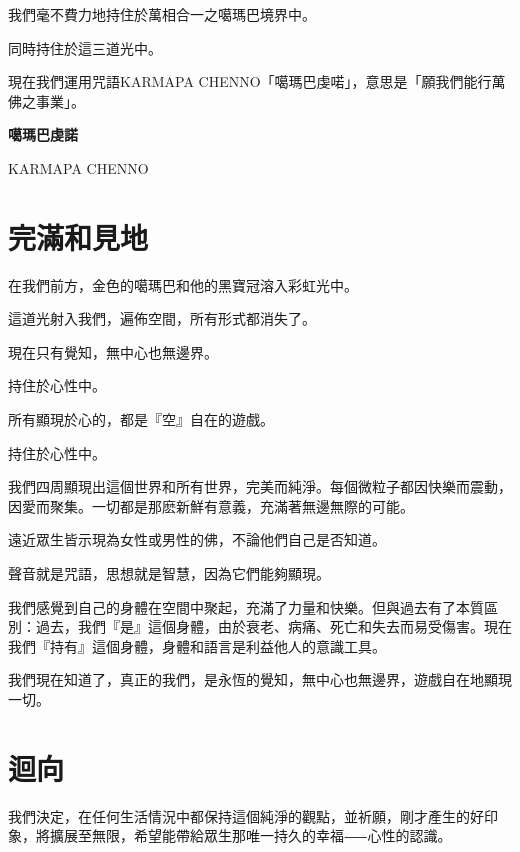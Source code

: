 \documentclass[a6paper,10pt]{ctexbook}
\newcommand{\remark}[1]{\vspace*{2pt} \textsf{#1}\vspace*{2pt}}
\begin{document}
我們毫不費力地持住於萬相合一之噶瑪巴境界中。

\remark{同時持住於這三道光中。}

現在我們運用咒語KARMAPA CHENNO「噶瑪巴虔喏」，意思是「願我們能行萬佛之事業」。

\begin{center}\large\bfseries
噶瑪巴虔諾

KARMAPA CHENNO
\end{center}

\section*{完滿和見地}

在我們前方，金色的噶瑪巴和他的黑寶冠溶入彩虹光中。

這道光射入我們，遍佈空間，所有形式都消失了。

現在只有覺知，無中心也無邊界。

\remark{持住於心性中。}

所有顯現於心的，都是『空』自在的遊戲。

\remark{持住於心性中。}

我們四周顯現出這個世界和所有世界，完美而純淨。每個微粒子都因快樂而震動，因愛而聚集。一切都是那麽新鮮有意義，充滿著無邊無際的可能。

遠近眾生皆示現為女性或男性的佛，不論他們自己是否知道。

聲音就是咒語，思想就是智慧，因為它們能夠顯現。

我們感覺到自己的身體在空間中聚起，充滿了力量和快樂。但與過去有了本質區別：過去，我們『是』這個身體，由於衰老、病痛、死亡和失去而易受傷害。現在我們『持有』這個身體，身體和語言是利益他人的意識工具。

我們現在知道了，真正的我們，是永恆的覺知，無中心也無邊界，遊戲自在地顯現一切。

\section*{迴向}

我們決定，在任何生活情況中都保持這個純淨的觀點，並祈願，剛才產生的好印象，將擴展至無限，希望能帶給眾生那唯一持久的幸福⸺心性的認識。
\newpage
\theendnotes
\end{document}
